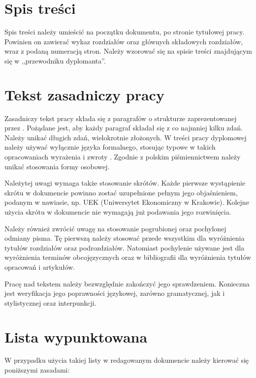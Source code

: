 \section{Spis treści}
Spis treści należy umieścić na początku dokumentu, po stronie tytułowej pracy. Powinien on zawierać wykaz rozdziałów oraz głównych składowych rozdziałów, wraz z podaną numeracją stron. Należy wzorować się na spisie treści znajdującym się w ,,przewodniku dyplomanta''.


\section{Tekst zasadniczy pracy}

Zasadniczy tekst pracy składa się z paragrafów o strukturze zaprezentowanej przez \citet{website:paragraph}. Pożądane jest, aby każdy paragraf składał się z co najmniej kilku zdań. Należy unikać długich zdań, wielokrotnie złożonych. W treści pracy dyplomowej należy używać wyłącznie języka formalnego, stosując typowe w takich opracowaniach wyrażenia i zwroty \citep{website:zimny, weglinska}. Zgodnie z polskim piśmiennictwem należy unikać stosowania formy osobowej.

Należytej uwagi wymaga także stosowanie skrótów. Każde pierwsze wystąpienie skrótu w dokumencie powinno zostać uzupełnione pełnym jego objaśnieniem, podanym w nawiasie, np. UEK (Uniwersytet Ekonomiczny w Krakowie). Kolejne użycia skrótu w dokumencie nie wymagają już podawania jego rozwinięcia.

Należy również zwrócić uwagę na stosowanie pogrubionej oraz pochylonej odmiany pisma. Tę pierwszą należy stosować przede wszystkim dla wyróżnienia tytułów rozdziałów oraz podrozdziałów. Natomiast pochylenie używane jest dla wyróżnienia terminów obcojęzycznych oraz w bibliografii dla wyróżnienia tytułów opracowań i artykułów. 

Pracę nad tekstem należy bezwzględnie zakończyć jego sprawdzeniem. Konieczna jest weryfikacja jego poprawności językowej, zarówno gramatycznej, jak i stylistycznej oraz interpunkcji.


\section{Lista wypunktowana}

W przypadku użycia takiej listy w redagowanym dokumencie należy kierować się poniższymi zasadami:

